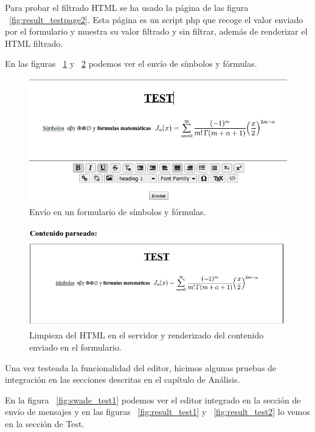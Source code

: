 Para probar el filtrado HTML se ha usado la página de las figura ~\ref{fig:result_testpage2}. Esta página es un script php que recoge el valor enviado por el formulario y muestra su valor filtrado y sin filtrar, además de renderizar el HTML filtrado.


En las figuras ~\ref{fig:result_testpage3} y ~\ref{fig:result_testpage4} podemos ver el envío de símbolos y fórmulas.

\begin{figure}[h!]
  \centering
      \includegraphics[width=5in]{fig/result_testpage3}
  \caption{Envío en un formulario de símbolos y fórmulas.}
  \label{fig:result_testpage3}

\end{figure}


\begin{figure}[h!]
  \centering
      \includegraphics[width=5in]{fig/result_testpage4}
  \caption{Limpieza del HTML en el servidor y renderizado del contenido enviado en el formulario.}
  \label{fig:result_testpage4}

\end{figure}

Una vez testeada la funcionalidad del editor, hicimos algunas pruebas de integración en las secciones descritas en el capítulo de Análisis. 

En la figura ~\ref{fig:swade_test1} podemos ver el editor integrado en la sección de envío de mensajes y en las figuras ~\ref{fig:result_test1} y ~\ref{fig:result_test2} lo vemos en la sección de Test. 

